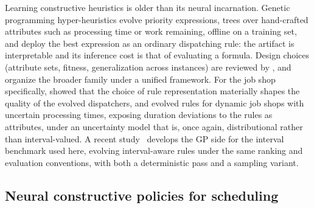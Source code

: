 \documentclass[preprint,authoryear,12pt]{elsarticle}
\theoremstyle{definition}
\theoremstyle{remark}
\begin{document}
Learning constructive heuristics is older than its neural
incarnation. Genetic programming hyper-heuristics evolve priority
expressions, trees over hand-crafted attributes such as processing
time or work remaining, offline on a training set, and deploy the
best expression as an ordinary dispatching rule: the artifact is
interpretable and its inference cost is that of evaluating a formula.
Design choices (attribute sets, fitness, generalization across
instances) are reviewed by \citet{Branke2016}, and \citet{Nguyen2017}
organize the broader family under a unified framework. For the job
shop specifically, \citet{Nguyen2013} showed that the choice of rule
representation materially shapes the quality of the evolved
dispatchers, and \citet{Karunakaran2016} evolved rules for dynamic
job shops with uncertain processing times, exposing duration
deviations to the rules as attributes, under an uncertainty model
that is, once again, distributional rather than interval-valued. A recent
study~\citep{DiazGP2026} develops the GP side for the interval
benchmark used here, evolving interval-aware rules under the same
ranking and evaluation conventions, with both a deterministic pass
and a sampling variant.

\subsection{Neural constructive policies for scheduling}
\label{sec:related-learning}
\end{document}
